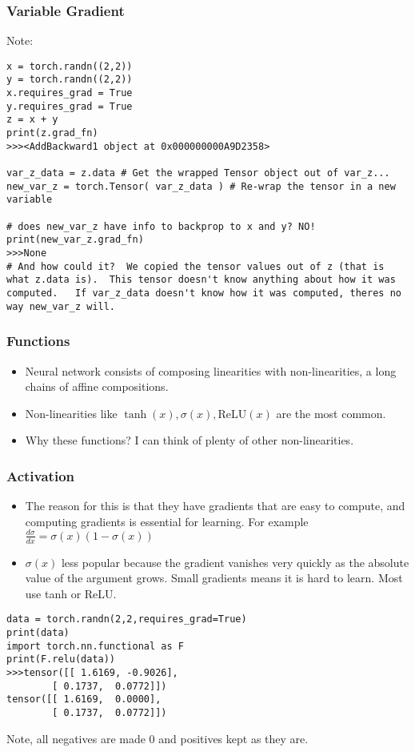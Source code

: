  
\begin{frame}[fragile]
\frametitle{Variable Gradient}
Note:
 \begin{lstlisting}
x = torch.randn((2,2))
y = torch.randn((2,2))
x.requires_grad = True
y.requires_grad = True
z = x + y 
print(z.grad_fn)
>>><AddBackward1 object at 0x000000000A9D2358>

var_z_data = z.data # Get the wrapped Tensor object out of var_z...
new_var_z = torch.Tensor( var_z_data ) # Re-wrap the tensor in a new variable

# does new_var_z have info to backprop to x and y? NO!
print(new_var_z.grad_fn)
>>>None
# And how could it?  We copied the tensor values out of z (that is what z.data is).  This tensor doesn't know anything about how it was computed.   If var_z_data doesn't know how it was computed, theres no way new_var_z will.
\end{lstlisting}

\end{frame} 
 
 
\begin{frame}[fragile]
\frametitle{Functions}

\begin{itemize}
\item Neural network consists of composing linearities with non-linearities, a long chains of affine compositions.
\item Non-linearities like $\tanh(x), \sigma(x), \text{ReLU}(x)$ are the most common.
\item Why these functions? I can think of plenty of other non-linearities.
\end{itemize}
\end{frame} 

\begin{frame}[fragile]
\frametitle{Activation}

\begin{itemize}
\item The reason for this is that they have gradients that are easy to compute, and computing gradients is essential for learning. For example $ \frac{d\sigma}{dx} = \sigma(x)(1 - \sigma(x)) $
\item $ \sigma(x)$ less popular because the gradient vanishes very quickly as the absolute value of the argument grows. Small gradients means it is hard to learn. Most use tanh or ReLU.
\end{itemize}
 \begin{lstlisting}
data = torch.randn(2,2,requires_grad=True)
print(data)
import torch.nn.functional as F
print(F.relu(data))
>>>tensor([[ 1.6169, -0.9026],
        [ 0.1737,  0.0772]])
tensor([[ 1.6169,  0.0000],
        [ 0.1737,  0.0772]])
 \end{lstlisting}
 Note, all negatives are made 0 and positives kept as they are.
\end{frame} 

